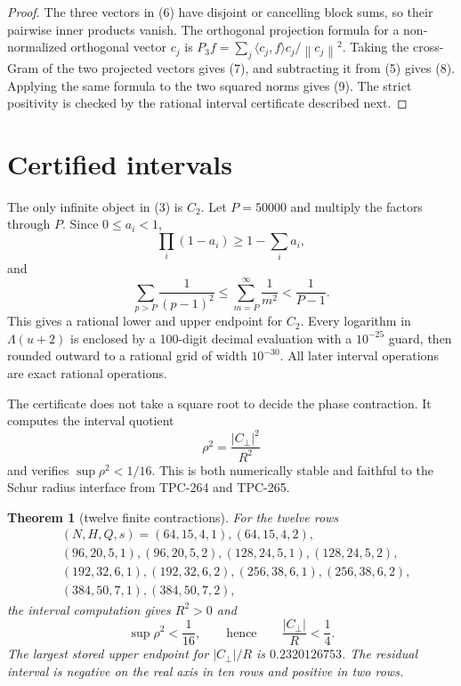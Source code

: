 \documentclass[11pt]{article}
\newtheorem{theorem}{Theorem}
\newcommand{\norm}[1]{\left\lVert #1\right\rVert}
\begin{document}
\begin{proof}
The three vectors in (6) have disjoint or cancelling block sums, so their
pairwise inner products vanish.  The orthogonal projection formula for a
non-normalized orthogonal vector \(c_j\) is
\(P_3f=\sum_j\langle c_j,f\rangle c_j/\norm{c_j}^2\).
Taking the cross-Gram of the two projected vectors gives (7), and subtracting
it from (5) gives (8).  Applying the same formula to the two squared norms
gives (9).  The strict positivity is checked by the rational interval
certificate described next.
\end{proof}

\section{Certified intervals}

The only infinite object in (3) is \(C_2\).  Let \(P=50000\) and multiply
the factors through \(P\).  Since \(0\leq a_i<1\),
\[
 \prod_i(1-a_i)\geq1-\sum_i a_i,
\]
and
\[
 \sum_{p>P}\frac1{(p-1)^2}
 \leq\sum_{m=P}^{\infty}\frac1{m^2}<\frac1{P-1}.             \tag{10}
\]
This gives a rational lower and upper endpoint for \(C_2\).  Every logarithm
in \(\Lambda(u+2)\) is enclosed by a 100-digit decimal evaluation with a
\(10^{-25}\) guard, then rounded outward to a rational grid of width
\(10^{-30}\).  All later interval operations are exact rational operations.

The certificate does not take a square root to decide the phase contraction.
It computes the interval quotient
\[
 \rho^2=\frac{|C_\perp|^2}{R^2}                           \tag{11}
\]
and verifies \(\sup\rho^2<1/16\).  This is both numerically stable and
faithful to the Schur radius interface from TPC-264 and TPC-265.

\begin{theorem}[twelve finite contractions]
For the twelve rows
\[
\begin{split}
 &(N,H,Q,s)=(64,15,4,1),(64,15,4,2),\\
 &(96,20,5,1),(96,20,5,2),(128,24,5,1),(128,24,5,2),\\
 &(192,32,6,1),(192,32,6,2),(256,38,6,1),(256,38,6,2),\\
 &(384,50,7,1),(384,50,7,2),
\end{split}
\]
the interval computation gives \(R^2>0\) and
\[
 \sup \rho^2<\frac1{16},\qquad\text{hence}\qquad
 \frac{|C_\perp|}{R}<\frac14.                               \tag{12}
\]
The largest stored upper endpoint for \(|C_\perp|/R\) is
\(0.2320126753\).  The residual interval is negative on the real axis in ten
rows and positive in two rows.
\end{theorem}
\end{document}
